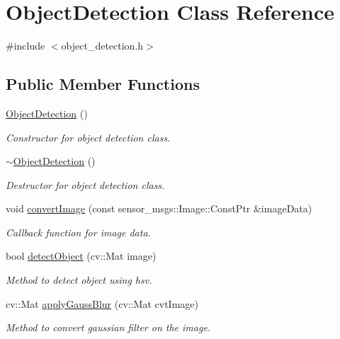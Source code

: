 \hypertarget{classObjectDetection}{}\section{Object\+Detection Class Reference}
\label{classObjectDetection}


{\ttfamily \#include $<$object\+\_\+detection.\+h$>$}

\subsection*{Public Member Functions}
\begin{DoxyCompactItemize}
\item 
\hyperlink{classObjectDetection_a6ccb25952ecc45811451c5cb623e23ee}{Object\+Detection} ()
\begin{DoxyCompactList}\small\item\em Constructor for object detection class. \end{DoxyCompactList}\item 
\hyperlink{classObjectDetection_ad5d9d344ab55095927725733590f0da5}{$\sim$\+Object\+Detection} ()
\begin{DoxyCompactList}\small\item\em Destructor for object detection class. \end{DoxyCompactList}\item 
void \hyperlink{classObjectDetection_abb6ea33423e081c37bd38e55f1347f52}{convert\+Image} (const sensor\+\_\+msgs\+::\+Image\+::\+Const\+Ptr \&image\+Data)
\begin{DoxyCompactList}\small\item\em Callback function for image data. \end{DoxyCompactList}\item 
bool \hyperlink{classObjectDetection_a63d13b70232d3d076a6c543c03f9c9ff}{detect\+Object} (cv\+::\+Mat image)
\begin{DoxyCompactList}\small\item\em Method to detect object using hsv. \end{DoxyCompactList}\item 
cv\+::\+Mat \hyperlink{classObjectDetection_a0f559ec8747dca4882aa3fe8f21e0fb8}{apply\+Gauss\+Blur} (cv\+::\+Mat cvt\+Image)
\begin{DoxyCompactList}\small\item\em Method to convert gaussian filter on the image. \end{DoxyCompactList}\item 

\end{DoxyCompactItemize}
